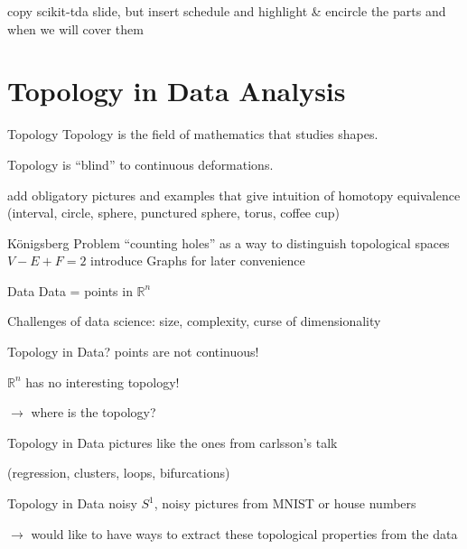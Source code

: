 \documentclass{beamer}
\begin{document}
\begin{frame}
copy scikit-tda slide, but insert schedule and highlight \& encircle the parts and when we will cover them
\end{frame}




\section{Topology in Data Analysis}

\begin{frame}{Topology}
Topology is the field of mathematics that studies shapes.

Topology is ``blind'' to continuous deformations.

add obligatory pictures and examples that give intuition of homotopy equivalence (interval, circle, sphere, punctured sphere, torus, coffee cup)
\end{frame}


\begin{frame}{Königsberg Problem}
``counting holes'' as a way to distinguish topological spaces
$V-E+F = 2$
introduce Graphs for later convenience
\end{frame}


\begin{frame}{Data}
Data = points in $\mathbb{R}^n$

Challenges of data science: size, complexity, curse of dimensionality
\end{frame}


\begin{frame}{Topology in Data?}
points are not continuous!

$\mathbb{R}^n$ has no interesting topology!

$\rightarrow$ where is the topology?
\end{frame}


\begin{frame}{Topology in Data}
pictures like the ones from carlsson's talk 

(regression, clusters, loops, bifurcations)
\end{frame}


\begin{frame}{Topology in Data}
noisy $S^1$, noisy pictures from MNIST or house numbers

$\rightarrow$ would like to have ways to extract these topological properties from the data
\end{frame}
\end{document}
